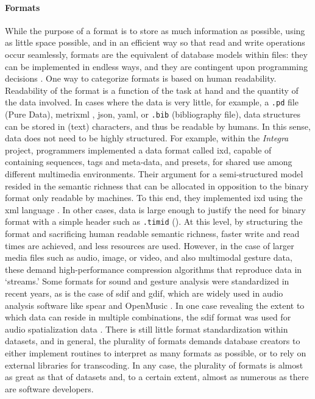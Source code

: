 {	\paragraph{Formats}
	While the purpose of a format is to store as much information as possible, using as little space possible, and in an efficient way so that read and write operations occur seamlessly, formats are the equivalent of database models within files: they can be implemented in endless ways, and they are contingent upon programming decisions \parencite[8]{Ste12:MP3}. One way to categorize formats is based on human readability. Readability of the format is a function of the task at hand and the quantity of the data involved. In cases where the data is very little, for example, a \texttt{.pd} file (Pure Data), \gls{metrixml} \parencite{Amatriain/2004/phdthesis}, \gls{json}, \gls{yaml}, or \texttt{.bib} (\latex bibliography file), data structures can be stored in (text) characters, and thus be readable by humans. In this sense, data does not need to be highly structured. For example, within the \textit{Integra} project, programmers implemented a data format called \gls{ixd}, capable of containing sequences, tags and meta-data, and presets, for shared use among different multimedia environments. Their argument for a semi-structured model resided in the semantic richness that can be allocated in opposition to the binary format only readable by machines. To this end, they implemented \gls{ixd} using the \gls{xml} language \parencite{icmc/bbp2372.2009.012}. In other cases, data is large enough to justify the need for binary format with a simple header such as \texttt{.timid} (). At this level, by structuring the format and sacrificing human readable semantic richness, faster write and read times are achieved, and less resources are used. However, in the case of larger media files such as audio, image, or video, and also multimodal gesture data, these demand high-performance compression algorithms that reproduce data in `streams.' Some formats for sound and gesture analysis were standardized in recent years, as is the case of \gls{sdif} and \gls{gdif}, which are widely used in audio analysis software like \gls{spear} and OpenMusic \parencites{icmc/bbp2372.2004.004}{kristian_nymoen_2011_849865}. In one case revealing the extent to which data can reside in multiple combinations, the \gls{sdif} format was used for audio spatialization data \parencite{icmc/bbp2372.2004.004}. There is still little format standardization within datasets, and in general, the plurality of formats demands database creators to either implement routines to interpret as many formats as possible, or to rely on external libraries for transcoding. In any case, the plurality of formats is almost as great as that of datasets and, to a certain extent, almost as numerous as there are software developers.

}
